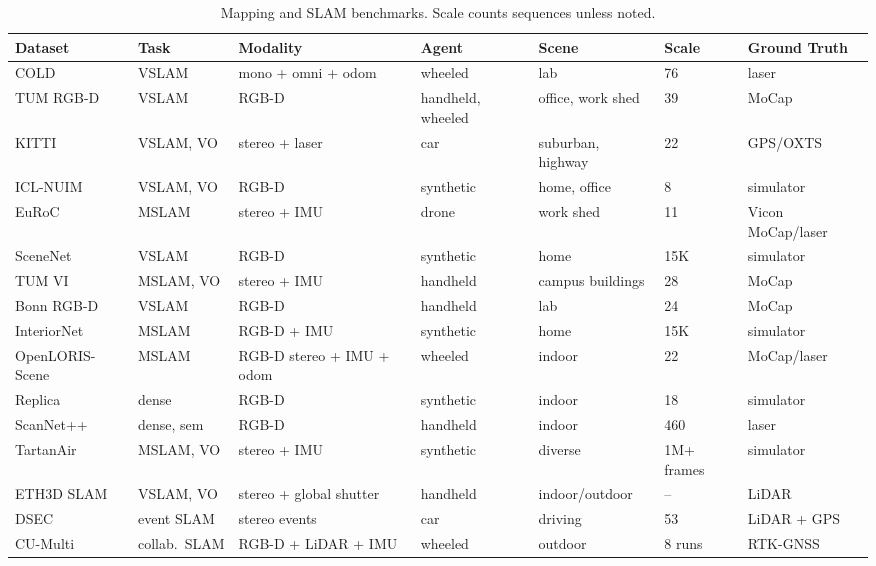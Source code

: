 \begin{table}[!th]
\centering
\caption{Mapping and SLAM benchmarks. Scale counts sequences unless noted.}
\label{tab:mapping_slam_dataset}
\fontsize{9}{11}\selectfont
\setlength{\tabcolsep}{1.2mm}
\begin{tabular}{L{0.17\textwidth} C{0.10\textwidth} C{0.16\textwidth} C{0.11\textwidth} C{0.13\textwidth} C{0.07\textwidth} C{0.13\textwidth}}
\toprule
\textbf{Dataset} & \textbf{Task} & \textbf{Modality} & \textbf{Agent} & \textbf{Scene} & \textbf{Scale} & \textbf{Ground Truth} \\
\midrule
COLD \cite{PronobisC09} & VSLAM & mono + omni + odom & wheeled & lab & 76 & laser \\
TUM RGB-D \cite{Sturm2012TUMRGBD} & VSLAM & RGB-D & handheld, wheeled & office, work shed & 39 & MoCap \\
KITTI \cite{KITTI-GeigerLU12} & VSLAM, VO & stereo + laser & car & suburban, highway & 22 & GPS/OXTS \\
ICL-NUIM \cite{HandaWMD14} & VSLAM, VO & RGB-D & synthetic & home, office & 8  & simulator \\
EuRoC \cite{Burri2016EuRoC} & MSLAM & stereo + IMU & drone & work shed & 11  & Vicon MoCap/laser \\
SceneNet \cite{McCormacHLD17} & VSLAM & RGB-D & synthetic & home & 15K  & simulator \\
TUM VI \cite{Schubert2018TUMVI} & MSLAM, VO & stereo + IMU & handheld & campus buildings & 28  & MoCap \\
Bonn RGB-D \cite{PalazzoloBLGS19} & VSLAM & RGB-D & handheld & lab & 24  & MoCap \\
InteriorNet \cite{LiSMCTYHTL18} & MSLAM & RGB-D + IMU & synthetic & home & 15K  & simulator \\
OpenLORIS-Scene \cite{ShiLZTTLZSQSGW020} & MSLAM & RGB-D stereo + IMU + odom & wheeled & indoor & 22  & MoCap/laser \\
Replica \cite{straub2019replica}        & dense       & RGB-D     & synthetic      & indoor       & 18    & simulator \\
ScanNet++ \cite{yeshwanth2023scannet++}  & dense, sem  & RGB-D     & handheld       & indoor       & 460   & laser \\
TartanAir \cite{TartanAir}      & MSLAM, VO   & stereo + IMU & synthetic  & diverse      & 1M+ frames   & simulator \\
ETH3D SLAM \cite{ETH3DSLAM}             & VSLAM, VO   & stereo + global shutter & handheld & indoor/outdoor &  -- & LiDAR \\
DSEC \cite{gehrig2021dsec}              & event SLAM  & stereo events & car       & driving      & 53    & LiDAR + GPS \\
CU-Multi \cite{albin2025cu}            & collab.\ SLAM & RGB-D + LiDAR + IMU & wheeled & outdoor & 8 runs & RTK-GNSS \\
\bottomrule
\end{tabular}
\end{table}

